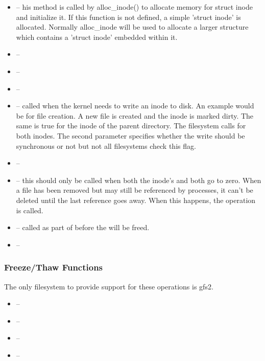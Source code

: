 \begin{itemize}
    \item {} -- his method is called by alloc\_inode() to allocate memory for struct inode and 
    		initialize it.  If this function is not defined, a simple 'struct inode' is allocated.  Normally 
		alloc\_inode will be used to allocate a larger structure which contains a 'struct inode' embedded within it.
    \item {} --
    \item {} -- 
    \item {} -- 
    \item {} -- called when the kernel needs to write an inode to disk. An example would be for file 
    	creation. A new file is created and the inode is marked dirty. The same is true for the inode of the parent 
	directory. The filesystem calls  for both inodes. The second parameter specifies 
	whether the write should be synchronous or not but not all filesystems check this flag.
    \item {} -- 
    \item {} -- this should only be called when both the inode's  and  
    	both go to zero. When a file has been removed but may still be referenced by processes, it can't be 
	deleted until the last reference goes away. When this happens, the  operation is called.
    \item {} -- called as part of  before the  will be freed.
    \item {} --
\end{itemize}    

\noindent


\subsubsection{Freeze/Thaw Functions}\label{freeze}

The only filesystem to provide support for these operations is gfs2.
    
\begin{itemize}
    \item {} --
    \item {} --
    \item {} --
    \item {} --
\end{itemize}    

